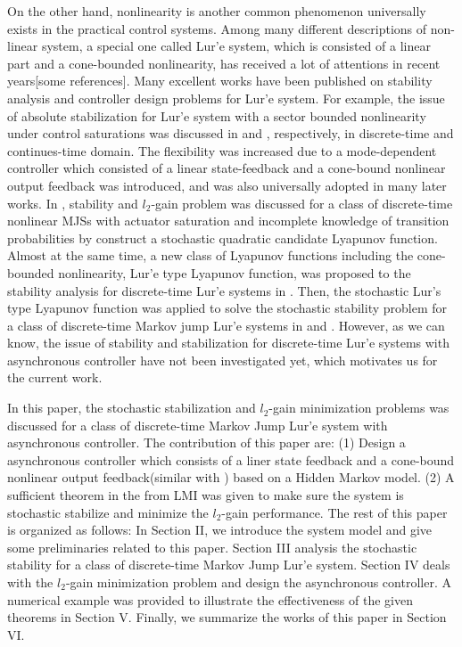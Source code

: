 \documentclass[conference]{IEEEtran}
\begin{document}

	On the other hand, nonlinearity is another common phenomenon universally exists in the practical control systems. Among many different descriptions of non-linear system, a special one called Lur'e system\cite{khnlil}, which is consisted of a linear part and a cone-bounded nonlinearity, has received a lot of attentions in recent years[some references]. Many excellent works have been published on stability analysis and controller design problems for Lur'e system. For example, the issue of absolute stabilization for Lur'e system with a sector bounded nonlinearity under control saturations was discussed in \cite{state_output_control_EB} and \cite{state_output_control_EB_continues}, respectively, in discrete-time and continues-time domain. The flexibility was increased due to a mode-dependent controller which consisted of a linear state-feedback and a cone-bound nonlinear output feedback was introduced, and was also universally adopted in many later works. In \cite{song_control}, stability and $l_2$-gain problem was discussed for a class of discrete-time nonlinear MJSs with actuator saturation and incomplete knowledge of transition probabilities by construct a stochastic quadratic candidate Lyapunov function. Almost at the same time, a new class of Lyapunov functions including the cone-bounded nonlinearity, Lur'e type Lyapunov function, was proposed to the stability analysis for discrete-time Lur'e systems in \cite{gonzaga}. Then, the stochastic Lur's type Lyapunov function was applied to solve the stochastic stability problem for a class of discrete-time Markov jump Lur'e systems in \cite{costaolv_control_1} and \cite{costaolv_control}. However, as we can know, the issue of stability and stabilization for discrete-time Lur'e systems with asynchronous controller have not been investigated yet, which motivates us for the current work. 
	
	In this paper, the stochastic stabilization and $l_2$-gain minimization problems was discussed for a class of discrete-time Markov Jump Lur'e system with asynchronous controller. The contribution of this paper are: (1) Design a asynchronous controller which consists of a liner state feedback and a cone-bound nonlinear output feedback(similar with \cite{gonzaga}) based on a Hidden Markov model. (2) A sufficient theorem in the from LMI was given to make sure the system is stochastic stabilize and minimize the $l_2$-gain performance. The rest of this paper is organized as follows: In Section II, we introduce the system model and give some preliminaries related to this paper.  Section III analysis the stochastic stability for a class of discrete-time Markov Jump Lur'e system.  Section IV deals with the $l_2$-gain minimization problem and design the asynchronous controller. A numerical example was provided to illustrate the effectiveness of the given theorems in Section V. Finally, we summarize the works of this paper in Section VI. 
	
\end{document}

